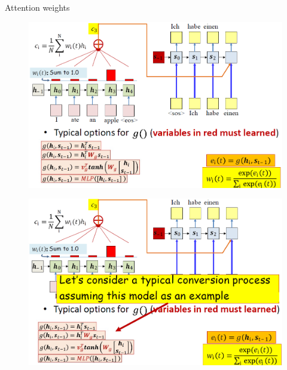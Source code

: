 \begin{frame}[allowframebreaks]{Attention weights}
    \begin{figure}
        \centering
        \includegraphics[width=\textwidth]{images/attention/attention-6.png}
    \end{figure}
\framebreak
    \begin{figure}
        \centering
        \includegraphics[width=\textwidth]{images/attention/attention-7.png}
    \end{figure}
\end{frame}
